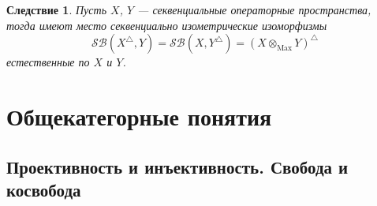 \documentclass[12pt]{article}
\newtheorem{corollary}[theorem]{Следствие}
\begin{document}
\begin{corollary}\label{CorSQUnivPropMaxTenProd}
Пусть $X$, $Y$ --- секвенциальные операторные пространства, тогда имеют место секвенциально изометрические изоморфизмы
$$
\mathcal{SB}(X^\triangle, Y)=\mathcal{SB}(X,Y^\triangle)=(X\otimes_{\operatorname{Max}} Y)^\triangle
$$
естественные по $X$ и $Y$. 
\end{corollary}







































\section{Общекатегорные понятия}

\subsection{Проективность и инъективность. Свобода и косвобода}
\end{document}
